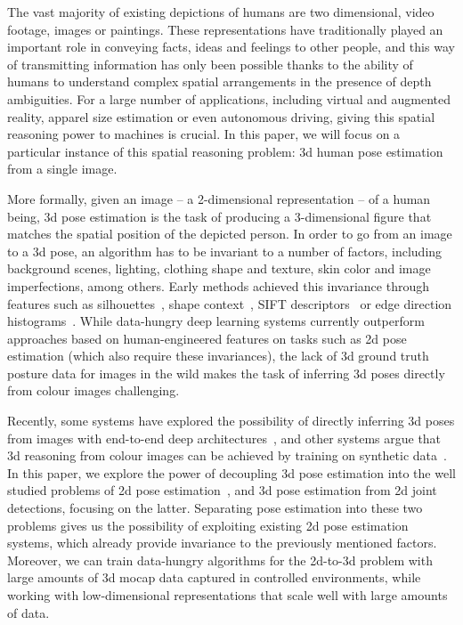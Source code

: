 \documentclass[10pt,twocolumn,letterpaper]{article}
\begin{document}
The vast majority of existing depictions of humans are two dimensional, \eg video footage, images or paintings. These representations have traditionally played an important role in conveying facts, ideas and feelings to other people, and this way of transmitting information has only been possible thanks to the ability of humans to understand complex spatial arrangements in the presence of depth ambiguities. For a large number of applications, including virtual and augmented reality, apparel size estimation or even autonomous driving, giving this spatial reasoning power to machines is crucial. In this paper, we will focus on a particular instance of this spatial reasoning problem: 3d human pose estimation from a single image.

More formally, given an image -- a 2-dimensional representation -- of a human being, 3d pose estimation is the task of producing a 3-dimensional figure that matches the spatial position of the depicted person.
In order to go from an image to a 3d pose, an algorithm has to be invariant to a number of factors, including background scenes, lighting, clothing shape and texture, skin color and image imperfections, among others.
Early methods achieved this invariance through features such as silhouettes~\cite{AgarwalT04}, shape context~\cite{bb93102}, SIFT descriptors~\cite{bb41073} or edge direction histograms~\cite{bb93266}.
While data-hungry deep learning systems currently outperform approaches based on human-engineered features on tasks such as 2d pose estimation (which also require these invariances), the lack of 3d ground truth posture data for images in the wild makes the task of inferring 3d poses directly from colour images challenging.

Recently, some systems have explored the possibility of directly inferring 3d poses from images with end-to-end deep architectures~\cite{tekin2016structured,volumetric}, and other systems argue that 3d reasoning from colour images can be achieved by training on synthetic data~\cite{RogezS16, varol_2017}. In this paper, we explore the power of decoupling 3d pose estimation into the well studied problems of 2d pose estimation~\cite{cpm, stacked-hourglass}, and 3d pose estimation from 2d joint detections, focusing on the latter.
Separating pose estimation into these two problems gives us the possibility of exploiting existing 2d pose estimation systems, which already provide invariance to the previously mentioned factors. Moreover, we can train data-hungry algorithms for the 2d-to-3d problem with large amounts of 3d mocap data captured in controlled environments, while working with low-dimensional representations that scale well with large amounts of data.
\end{document}
